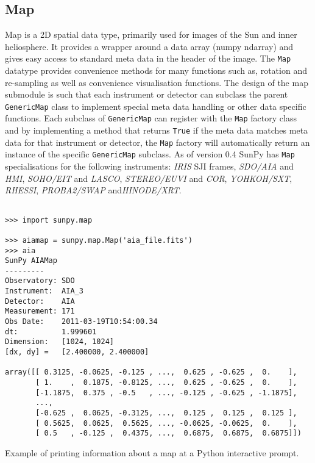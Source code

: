 \subsection{Map}
Map is a 2D spatial data type, primarily used for images of the Sun and 
inner heliosphere. It provides a wrapper around a data array (numpy 
ndarray) and gives easy access to standard meta data in the header of the 
image.
The \texttt{Map} datatype provides convenience methods for many functions 
such as, rotation and re-sampling as well as convenience visualisation 
functions.
The design of the map submodule is such that each instrument or 
detector can subclass the parent \texttt{GenericMap} class to implement 
special meta data handling or other data specific functions. Each subclass 
of \texttt{GenericMap} can register with the \texttt{Map} factory class and 
by implementing a method that returns \texttt{True} if the meta data 
matches meta data for that instrument or detector, the \texttt{Map} factory 
will automatically return an instance of the specific \texttt{GenericMap} 
subclass. As of version 0.4 SunPy has \texttt{Map} specialisations for the 
following instruments: \textit{IRIS} SJI frames, \textit{SDO/AIA} and 
\textit{HMI}, \textit{SOHO/EIT} and 	\textit{LASCO}, 
\textit{STEREO/EUVI} 	and \textit{COR}, \textit{YOHKOH/SXT}, 
\textit{RHESSI}, \textit{PROBA2/SWAP} and\textit{HINODE/XRT}.

\begin{listing}[h]
\begin{verbatim}

>>> import sunpy.map

>>> aiamap = sunpy.map.Map('aia_file.fits')
>>> aia
SunPy AIAMap
---------
Observatory: SDO
Instrument:  AIA_3
Detector:    AIA
Measurement: 171
Obs Date:    2011-03-19T10:54:00.34
dt:          1.999601
Dimension:   [1024, 1024]
[dx, dy] =   [2.400000, 2.400000]

array([[ 0.3125, -0.0625, -0.125 , ...,  0.625 , -0.625 ,  0.    ],
       [ 1.    ,  0.1875, -0.8125, ...,  0.625 , -0.625 ,  0.    ],
       [-1.1875,  0.375 , -0.5   , ..., -0.125 , -0.625 , -1.1875],
       ..., 
       [-0.625 ,  0.0625, -0.3125, ...,  0.125 ,  0.125 ,  0.125 ],
       [ 0.5625,  0.0625,  0.5625, ..., -0.0625, -0.0625,  0.    ],
       [ 0.5   , -0.125 ,  0.4375, ...,  0.6875,  0.6875,  0.6875]])

\end{verbatim}
\caption{Example of printing information about a map at a Python interactive 
prompt.}
\label{code:aia_2}
\end{listing}

